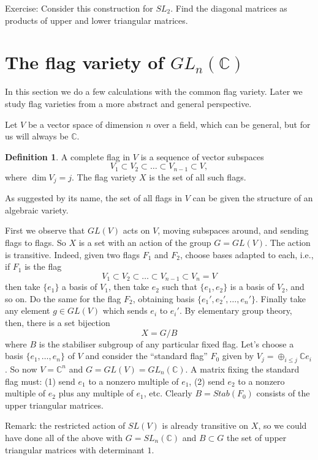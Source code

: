 \documentclass[12pt]{article}
\theoremstyle{plain}
\theoremstyle{definition}
\newtheorem{defn}{Definition}[section]
\numberwithin{equation}{section}
\newcommand{\C}{\mathbb{C}}
\begin{document}
Exercise: Consider this construction for $SL_2$. Find the diagonal matrices as products of upper and lower triangular matrices.








\section{The flag variety of $GL_n(\C)$}

In this section we do a few calculations with the common flag variety. Later we study flag varieties from a more abstract and general perspective.

Let $V$ be a vector space of dimension $n$ over a field, which can be general, but for us will always be $\C$.
\begin{defn}
A complete flag in $V$ is a sequence of vector subspaces
\[
V_1 \subset V_2 \subset \ldots \subset V_{n-1} \subset V,
\]
where $\dim V_j = j$. The flag variety $X$ is the set of all such flags.
\end{defn}
As suggested by its name, the set of all flags in $V$ can be given the structure of an algebraic variety.

First we observe that $GL(V)$ acts on $V$, moving subspaces around, and sending flags to flags. So $X$ is a set with an action of the group $G = GL(V)$. The action is transitive. Indeed, given two flags $F_1$ and $F_2$, choose bases adapted to each, i.e., if $F_1$ is the flag
\[
V_1 \subset V_2 \subset \ldots \subset V_{n-1} \subset V_n = V
\]
then take $\{e_1\}$ a basis of $V_1$, then take $e_2$ such that $\{e_1, e_2\}$ is a basis of $V_2$, and so on. Do the same for the flag $F_2$, obtaining basis $\{e_1', e_2', \ldots, e_n'\}$. Finally take any element $g \in GL(V)$ which sends $e_i$ to $e_i'$. By elementary group theory, then, there is a set bijection
\[
X = G / B
\]
where $B$ is the stabiliser subgroup of any particular fixed flag. Let's choose a basis $\{e_1, \ldots, e_n\}$ of $V$ and consider the ``standard flag'' $F_0$ given by $V_j = \oplus_{i \leq j} \C e_i$. So now $V = \C^n$ and $G = GL(V) = GL_n(\C)$. A matrix fixing the standard flag must: (1) send $e_1$ to a nonzero multiple of $e_1$, (2) send $e_2$ to a nonzero multiple of $e_2$ plus any multiple of $e_1$, etc. Clearly $B = Stab(F_0)$ consists of the upper triangular matrices.

Remark: the restricted action of $SL(V)$ is already transitive on $X$, so we could have done all of the above with $G = SL_n(\C)$ and $B \subset G$ the set of upper triangular matrices with determinant $1$.
\end{document}
